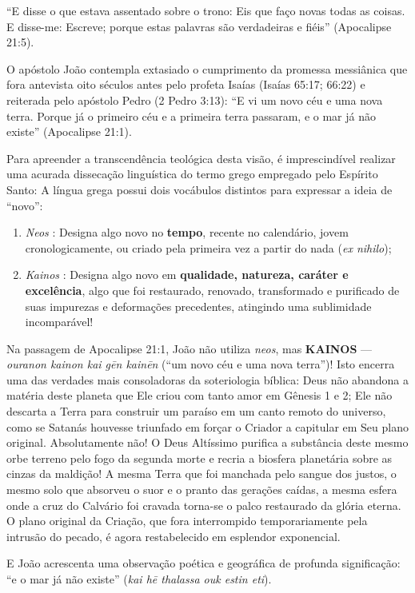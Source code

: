``E disse o que estava assentado sobre o trono: Eis que faço novas todas as coisas. E disse-me: Escreve; porque estas palavras são verdadeiras e fiéis'' (Apocalipse 21:5).

O apóstolo João contempla extasiado o cumprimento da promessa messiânica que fora antevista oito séculos antes pelo profeta Isaías (Isaías 65:17; 66:22) e reiterada pelo apóstolo Pedro (2 Pedro 3:13):
``E vi um novo céu e uma nova terra. Porque já o primeiro céu e a primeira terra passaram, e o mar já não existe'' (Apocalipse 21:1).

Para apreender a transcendência teológica desta visão, é imprescindível realizar uma acurada dissecação linguística do termo grego empregado pelo Espírito Santo:
A língua grega possui dois vocábulos distintos para expressar a ideia de ``novo'':
\begin{enumerate}
  \item \textit{Neos} : Designa algo novo no \textbf{tempo}, recente no calendário, jovem cronologicamente, ou criado pela primeira vez a partir do nada (\textit{ex nihilo});
  \item \textit{Kainos} : Designa algo novo em \textbf{qualidade, natureza, caráter e excelência}, algo que foi restaurado, renovado, transformado e purificado de suas impurezas e deformações precedentes, atingindo uma sublimidade incomparável!
\end{enumerate}


Na passagem de Apocalipse 21:1, João não utiliza \textit{neos}, mas \textbf{KAINOS} — \textit{ouranon kainon kai gēn kainēn} (``um novo céu e uma nova terra'')!
Isto encerra uma das verdades mais consoladoras da soteriologia bíblica: Deus não abandona a matéria deste planeta que Ele criou com tanto amor em Gênesis 1 e 2; Ele não descarta a Terra para construir um paraíso em um canto remoto do universo, como se Satanás houvesse triunfado em forçar o Criador a capitular em Seu plano original.
Absolutamente não! O Deus Altíssimo purifica a substância deste mesmo orbe terreno pelo fogo da segunda morte e recria a biosfera planetária sobre as cinzas da maldição! A mesma Terra que foi manchada pelo sangue dos justos, o mesmo solo que absorveu o suor e o pranto das gerações caídas, a mesma esfera onde a cruz do Calvário foi cravada torna-se o palco restaurado da glória eterna. O plano original da Criação, que fora interrompido temporariamente pela intrusão do pecado, é agora restabelecido em esplendor exponencial.

E João acrescenta uma observação poética e geográfica de profunda significação:
``e o mar já não existe'' (\textit{kai hē thalassa ouk estin eti}).

